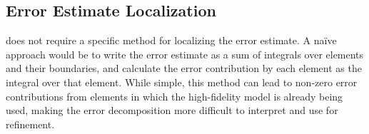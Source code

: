 \documentclass[review,sort&compress]{elsarticle}
\begin{document}
\subsection{Error Estimate Localization}\label{sec:errLocal}

 does not require a specific method for localizing the error estimate. A na\"{i}ve approach would be to write the error estimate as a sum of integrals over elements and their boundaries, and calculate the error contribution by each element as the integral over that element. While simple, this method can lead to non-zero error contributions from elements in which the high-fidelity model is already being used, making the error decomposition more difficult to interpret and use for refinement.
\end{document}
